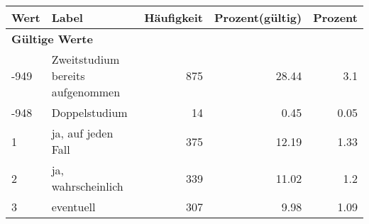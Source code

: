      \begin{longtable}{lXrrr}
     \toprule
     \textbf{Wert} & \textbf{Label} & \textbf{Häufigkeit} & \textbf{Prozent(gültig)} & \textbf{Prozent} \\
     \endhead
     \midrule
     \multicolumn{5}{l}{\textbf{Gültige Werte}}\\

     -949 &
     \multicolumn{1}{X}{ Zweitstudium bereits aufgenommen   } &


       \num{875} &
       \num[round-mode=places,round-precision=2]{28.44} &
         \num[round-mode=places,round-precision=2]{3.1} \\

     -948 &
     \multicolumn{1}{X}{ Doppelstudium   } &


       \num{14} &
       \num[round-mode=places,round-precision=2]{0.45} &
         \num[round-mode=places,round-precision=2]{0.05} \\

     1 &
     \multicolumn{1}{X}{ ja, auf jeden Fall   } &


       \num{375} &
       \num[round-mode=places,round-precision=2]{12.19} &
         \num[round-mode=places,round-precision=2]{1.33} \\

     2 &
     \multicolumn{1}{X}{ ja, wahrscheinlich   } &


       \num{339} &
       \num[round-mode=places,round-precision=2]{11.02} &
         \num[round-mode=places,round-precision=2]{1.2} \\

     3 &
     \multicolumn{1}{X}{ eventuell   } &


       \num{307} &
       \num[round-mode=places,round-precision=2]{9.98} &
         \num[round-mode=places,round-precision=2]{1.09} \\


\end{longtable}
